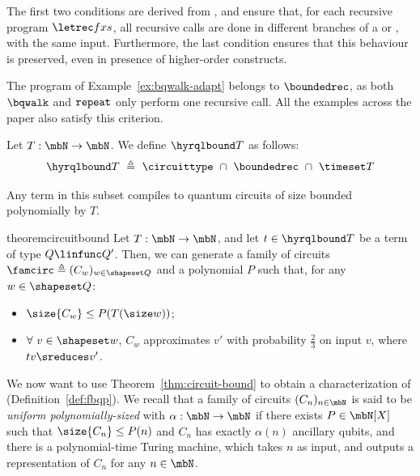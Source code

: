 The first two conditions are derived from \cite{HPS25}, and ensure that, for
each recursive program $\letrec f x s$, all recursive calls are done in
different branches of a \textqcase{} or \textmatch{}, with the same input.
Furthermore, the last condition ensures that this behaviour is preserved, even
in presence of higher-order constructs.

\begin{example}
  The program of Example~\ref{ex:bqwalk-adapt} belongs to
  $\boundedrec$, as both $\bqwalk$ and $\tt repeat$ only perform one recursive
  call. All the examples across the paper also satisfy this criterion.
\end{example}

\begin{definition}\label{def:hyrqlbound}
  Let $T : \mbN \to \mbN$. We define $\hyrqlbound T$ as follows:
  \[
    \hyrqlbound T\ \triangleq\ \circuittype\ \cap\ \boundedrec\ \cap\ \timeset T
  \]
\end{definition}

Any term in this subset compiles to quantum circuits of size bounded
polynomially by $T$.

\begin{restatable}{theorem}{circuitbound}
  \label{thm:circuit-bound}
  Let $T : \mbN \to \mbN$, and let $t \in \hyrqlbound T$ be a term of type
  $Q \linfunc Q'$. Then, we can generate a family of circuits
  $\famcirc \triangleq (C_w)_{w \in \shapeset Q}$ and a polynomial $P$ such
  that, for any $w \in \shapeset Q$:
  \begin{itemize}
    \item $\size{C_w} \leq P(T(\size w))$;
    \item $\forall\ v \in \shapeset w$, $C_w$ approximates $v'$ with
      probability $\frac 2 3$ on input $v$, where $tv \sreduces v'$.
  \end{itemize}
\end{restatable}

We now want to use Theorem~\ref{thm:circuit-bound} to obtain a characterization
of \fbqp{} (Definition~\ref{def:fbqp}). We recall that a family of circuits
$(C_n)_{n \in \mbN}$ is said to be \emph{uniform polynomially-sized} with
$\alpha : \mbN \to \mbN$ if there exists $P \in \mbN[X]$ such that $\size{C_n}
\leq P(n)$ and $C_n$ has exactly $\alpha(n)$ ancillary qubits, and there is a
polynomial-time Turing machine, which takes $n$ as input, and outputs a
representation of $C_n$ for any $n \in \mbN$.

